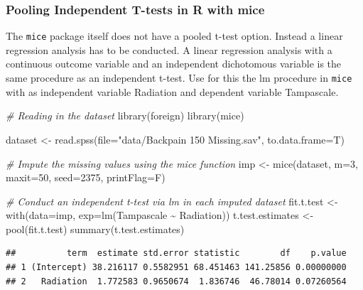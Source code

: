 \documentclass[
]{book}
\newenvironment{Shaded}{\begin{snugshade}}{\end{snugshade}}
\newcommand{\AttributeTok}[1]{\textcolor[rgb]{0.77,0.63,0.00}{#1}}
\newcommand{\CommentTok}[1]{\textcolor[rgb]{0.56,0.35,0.01}{\textit{#1}}}
\newcommand{\DecValTok}[1]{\textcolor[rgb]{0.00,0.00,0.81}{#1}}
\newcommand{\FunctionTok}[1]{\textcolor[rgb]{0.00,0.00,0.00}{#1}}
\newcommand{\NormalTok}[1]{#1}
\newcommand{\OtherTok}[1]{\textcolor[rgb]{0.56,0.35,0.01}{#1}}
\newcommand{\SpecialCharTok}[1]{\textcolor[rgb]{0.00,0.00,0.00}{#1}}
\newcommand{\StringTok}[1]{\textcolor[rgb]{0.31,0.60,0.02}{#1}}
\begin{document}
\hypertarget{pooling-independent-t-tests-in-r-with-mice}{%
\subsubsection{Pooling Independent T-tests in R with mice}\label{pooling-independent-t-tests-in-r-with-mice}}

The \texttt{mice} package itself does not have a pooled t-test option. Instead a linear regression analysis has to be conducted. A linear regression analysis with a continuous outcome variable and an independent dichotomous variable is the same procedure as an independent t-test. Use for this the lm procedure in \texttt{mice} with as independent variable Radiation and dependent variable Tampascale.

\begin{Shaded}
\begin{Highlighting}[]
\CommentTok{\# Reading in the dataset}
\FunctionTok{library}\NormalTok{(foreign)}
\FunctionTok{library}\NormalTok{(mice)}

\NormalTok{dataset }\OtherTok{\textless{}{-}} \FunctionTok{read.spss}\NormalTok{(}\AttributeTok{file=}\StringTok{"data/Backpain 150 Missing.sav"}\NormalTok{, }\AttributeTok{to.data.frame=}\NormalTok{T)}

\CommentTok{\# Impute the missing values using the mice function }
\NormalTok{imp }\OtherTok{\textless{}{-}} \FunctionTok{mice}\NormalTok{(dataset, }\AttributeTok{m=}\DecValTok{3}\NormalTok{, }\AttributeTok{maxit=}\DecValTok{50}\NormalTok{, }\AttributeTok{seed=}\DecValTok{2375}\NormalTok{, }\AttributeTok{printFlag=}\NormalTok{F)}
 
\CommentTok{\# Conduct an independent t{-}test via lm in each imputed dataset}
\NormalTok{fit.t.test }\OtherTok{\textless{}{-}} \FunctionTok{with}\NormalTok{(}\AttributeTok{data=}\NormalTok{imp, }\AttributeTok{exp=}\FunctionTok{lm}\NormalTok{(Tampascale }\SpecialCharTok{\textasciitilde{}}\NormalTok{ Radiation))}
\NormalTok{t.test.estimates }\OtherTok{\textless{}{-}} \FunctionTok{pool}\NormalTok{(fit.t.test)}
\FunctionTok{summary}\NormalTok{(t.test.estimates)}
\end{Highlighting}
\end{Shaded}

\begin{verbatim}
##          term  estimate std.error statistic        df    p.value
## 1 (Intercept) 38.216117 0.5582951 68.451463 141.25856 0.00000000
## 2   Radiation  1.772583 0.9650674  1.836746  46.78014 0.07260564
\end{verbatim}
\end{document}
